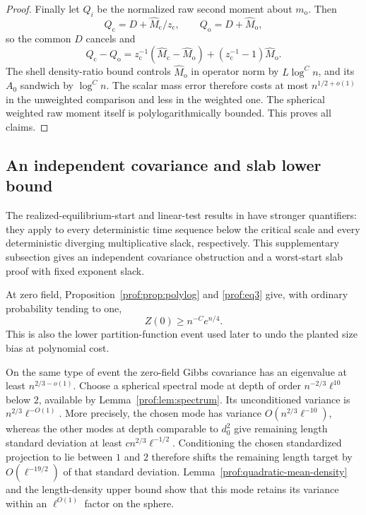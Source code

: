 \begin{proof}
Finally let $Q_i$ be the normalized raw second moment about
$m_{\mathrm o}$. Then
\[
 Q_{\mathrm c}=D+\widehat M_{\mathrm c}/z_{\mathrm c},\qquad
 Q_{\mathrm o}=D+\widehat M_{\mathrm o},
\]
so the common $D$ cancels and
\[
 Q_{\mathrm c}-Q_{\mathrm o}
 =z_{\mathrm c}^{-1}(\widehat M_{\mathrm c}-\widehat M_{\mathrm o})
 +(z_{\mathrm c}^{-1}-1)\widehat M_{\mathrm o}.
\]
The shell density-ratio bound controls $\widehat M_{\mathrm o}$ in
operator norm by $L\log^C n$, and its $A_0$ sandwich by $\log^C n$.
The scalar mass error therefore costs at most $n^{1/2+o(1)}$ in the
unweighted comparison and less in the weighted one. The spherical
weighted raw moment itself is polylogarithmically bounded. This proves
all claims.
\end{proof}

\subsection{An independent covariance and slab lower bound}
\label{prof:subsec:supplementary-lower}

The realized-equilibrium-start and linear-test results in
\cite[Theorems~1.2--1.3]{AcceptedCritical} have stronger quantifiers:
they apply to every deterministic time sequence below the critical
scale and every deterministic diverging multiplicative slack,
respectively.  This supplementary subsection gives an independent
covariance obstruction and a worst-start slab proof with fixed
exponent slack.

At zero field, Proposition~\ref{prof:prop:polylog} and
\eqref{prof:eq3} give, with ordinary probability tending to one,
\begin{equation}\label{prof:eq:cube-Z-lower}
 Z(0)\ge n^{-C}e^{n/4}.
\end{equation}
This is also the lower partition-function event used later to
undo the planted size bias at polynomial cost.

On the same type of event the zero-field Gibbs covariance has an
eigenvalue at least $n^{2/3-o(1)}$.  Choose a spherical spectral
mode at depth of order $n^{-2/3}\ell^{10}$ below $2$, available by
Lemma~\ref{prof:lem:spectrum}.  Its unconditioned variance is
$n^{2/3}\ell^{-O(1)}$. More precisely, the chosen mode has variance
$O(n^{2/3}\ell^{-10})$, whereas the other modes at depth comparable
to $d_0^2$ give remaining length standard deviation at least
$c n^{2/3}\ell^{-1/2}$. Conditioning the chosen standardized
projection to lie between $1$ and $2$ therefore shifts the remaining
length target by $O(\ell^{-19/2})$ of that standard deviation.
Lemma~\ref{prof:quadratic-mean-density}
and the length-density upper bound show that this mode retains its
variance within an $\ell^{O(1)}$ factor on the sphere.

